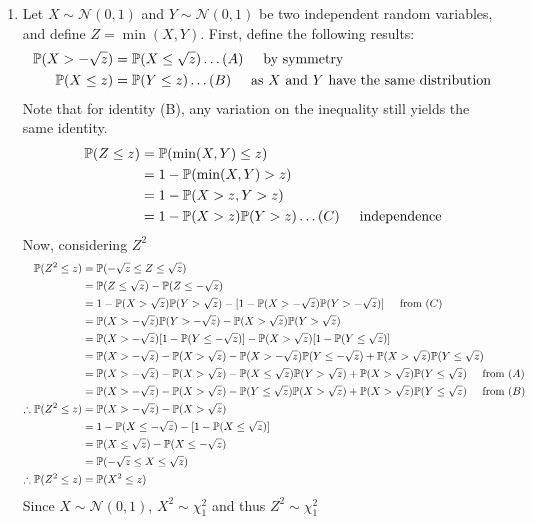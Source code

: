 \documentclass[a4paper]{article}
\newcommand{\p}{\mathbb{P}}
\newcommand{\ds}{\displaystyle}
\begin{document}
\begin{enumerate}
	\item Let $\ds{X \sim \mathcal{N}(0,1)}$ and $\ds{Y \sim \mathcal{N}(0,1)}$ be two independent random variables, and define $\ds{Z = \min(X,Y)}$. First, define the following results:
	\begin{align*}
		\p(X > -\sqrt{z}) & = \p(X \leq \sqrt{z}) \dots(A) \hspace{5mm} \text{by symmetry}\\
		\p(X \leq z) & = \p(Y \leq z) \dots(B) \hspace{5mm} \text{as $\ds{X}$ and $\ds{Y}$ have the same distribution}
	\end{align*}
	Note that for identity (B), any variation on the inequality still yields the same identity.
	\begin{align*}
		\p(Z \leq z) & = \p(\min(X,Y) \leq z) \\
		& = 1 - \p(\min(X,Y) > z) \\
		& = 1 - \p(X > z, Y > z) \\
		& = 1 - \p(X > z)\p(Y > z) \dots (C) \hspace{5mm} \text{independence}\\
	\end{align*}
	Now, considering $\ds{Z^2}$
	\begin{align*}
		\p(Z^2 \leq z) & = \p(-\sqrt{z} \leq Z \leq \sqrt{z})\\
		& = \p(Z \leq \sqrt{z}) - \p(Z \leq -\sqrt{z})\\
		& = 1 - \p(X > \sqrt{z})\p(Y > \sqrt{z}) - [1 - \p(X > -\sqrt{z})\p(Y > -\sqrt{z})] \hspace{5mm} \text{from } (C)\\
		& = \p(X > -\sqrt{z})\p(Y > -\sqrt{z}) - \p(X > \sqrt{z})\p(Y > \sqrt{z})\\
		& = \p(X > -\sqrt{z})[1 - \p(Y \leq -\sqrt{z})] - \p(X > \sqrt{z})[1 - \p(Y \leq \sqrt{z})]\\
		& = \p(X > -\sqrt{z}) - \p(X > \sqrt{z}) - \p(X > -\sqrt{z})\p(Y \leq -\sqrt{z}) + \p(X > \sqrt{z})\p(Y \leq \sqrt{z})\\
		& = \p(X > -\sqrt{z}) - \p(X > \sqrt{z}) - \p(X \leq \sqrt{z})\p(Y > \sqrt{z}) + \p(X > \sqrt{z})\p(Y \leq \sqrt{z})\hspace{5mm} \text{from } (A)\\
		& = \p(X > -\sqrt{z}) - \p(X > \sqrt{z}) - \p(Y \leq \sqrt{z})\p(X > \sqrt{z}) + \p(X > \sqrt{z})\p(Y \leq \sqrt{z})\hspace{5mm} \text{from } (B)\\
		\therefore \p(Z^2 \leq z) & = \p(X > -\sqrt{z}) - \p(X > \sqrt{z})\\
		& = 1 - \p(X \leq -\sqrt{z}) - [1 - \p(X \leq \sqrt{z})]\\
		& = \p(X \leq \sqrt{z}) - \p(X \leq -\sqrt{z})\\
		& = \p(-\sqrt{z} \leq X \leq \sqrt{z}) \\
		\therefore \p(Z^2 \leq z) & = \p(X^2 \leq z)\\
	\end{align*}
	Since $\ds{X \sim \mathcal{N}(0,1)}$, $\ds{X^2 \sim \chi_1^2}$ and thus $\ds{Z^2 \sim \chi_1^2}$


\end{enumerate}
\end{document}
